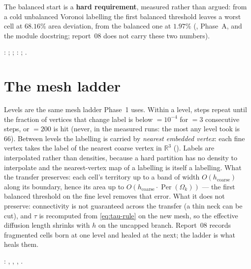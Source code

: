 \documentclass[11pt,a4paper]{article}
\begin{document}
The balanced start is a \textbf{hard requirement}, measured rather than argued:
from a cold unbalanced Voronoi labelling the first balanced threshold leaves a
worst cell at $68.16\%$ area deviation, from the balanced one at $1.97\%$
(, Phase~A, and the module
docstring; report~08 does not carry these two numbers).

\begin{tcolorbox}[colback=blue!4!white, colframe=blue!40!black,
                  title={Code: initialisation}, fontupper=\small]
: ;
; :
;
.
\end{tcolorbox}

\section{The mesh ladder}
\label{sec:ladder}

Levels are the same mesh ladder Phase~1 uses. Within a level, steps repeat until
the fraction of vertices that change label is below  $= 10^{-4}$
for  $= 3$ consecutive steps, or  $= 200$ is hit
(never, in the measured runs: the most any level took is 66). Between levels the
labelling is carried by \emph{nearest embedded vertex}: each fine vertex takes
the label of the nearest coarse vertex in $\mathbb{R}^3$ ().
Labels are interpolated rather than densities, because a hard partition has no
density to interpolate and the nearest-vertex map of a labelling is itself a
labelling. What the transfer preserves: each cell's territory up to a band of
width $O(h_{\text{coarse}})$ along its boundary, hence its area up to
$O(h_{\text{coarse}} \cdot \operatorname{Per}(\Omega_k))$ --- the first balanced
threshold on the fine level removes that error. What it does not preserve:
connectivity is not guaranteed across the transfer (a thin neck can be cut), and
$\tau$ is recomputed from \eqref{eq:tau-rule} on the new mesh, so the effective
diffusion length shrinks with $h$ on the uncapped branch. Report~08 records
fragmented cells born at one level and healed at the next; the ladder is what
heals them.

\begin{tcolorbox}[colback=blue!4!white, colframe=blue!40!black,
                  title={Code: ladder}, fontupper=\small]
: ,
,
, .
\end{tcolorbox}
\end{document}
